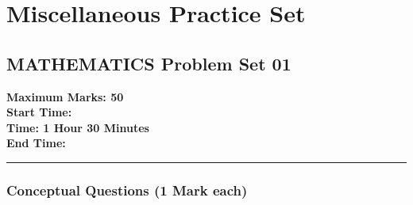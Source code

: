 \documentclass[12pt,a4paper,twoside]{book}
\begin{document}
		
		
		
		
\part{Miscellaneous Practice Set}

\chapter{MATHEMATICS Problem Set 01}

	\begin{center}
	\vspace{-20pt}
		\begin{multicols}{2}
		\textbf {Maximum Marks: 50}\\
\textbf{Start Time:}\\
\textbf{Time: 1 Hour 30 Minutes}\\
\textbf{End Time:}\\
		\end{multicols}
		\rule{\textwidth}{1pt}
	\end{center}
	\section*{Conceptual Questions (1 Mark each)}
	
\end{document}
